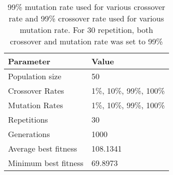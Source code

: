 \begin{table} [h!]
	  \centering
\begin{tabular}{|l|l|}
\hline
\textbf{Parameter} & \textbf{Value}   \\
\hline
Population size & 50 \\
\hline
Crossover Rates &  1\%, 10\%, 99\%, 100\% \\
\hline
Mutation Rates & 1\%, 10\%, 99\%, 100\% \\
\hline
Repetitions & 30 \\
\hline
Generations & 1000 \\
\hline
Average best fitness		 & 108.1341 \\
\hline
Minimum best fitness		 & 69.8973 \\
\hline
\end{tabular}
\caption{99\% mutation rate used for various crossover rate and 99\% crossover rate used for various mutation rate. For 30 repetition, both crossover and mutation rate was set to 99\% }
\label{table:defparams}
\end{table}